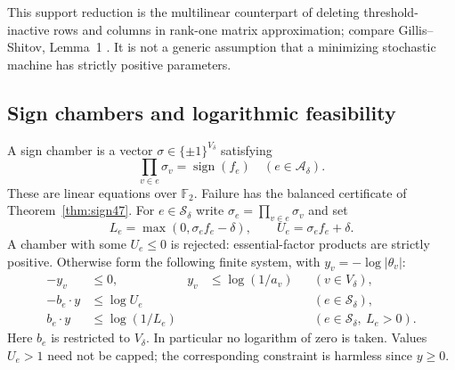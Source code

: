This support reduction is the multilinear counterpart of deleting
threshold-inactive rows and columns in rank-one matrix approximation;
compare Gillis--Shitov, Lemma~1 \cite{GS19}. It is not a generic
assumption that a minimizing stochastic machine has strictly positive
parameters.

\subsection{Sign chambers and logarithmic feasibility}
A sign chamber is a vector $\sigma\in\{\pm1\}^{V_\delta}$ satisfying
\begin{equation}\label{eq:signchamber49}
 \prod_{v\in e}\sigma_v=\operatorname{sign}(f_e)
                         \quad(e\in\mathcal A_\delta).
\end{equation}
These are linear equations over $\mathbb F_2$. Failure has the balanced
certificate of Theorem~\ref{thm:sign47}. For $e\in\mathcal S_\delta$
write $\sigma_e=\prod_{v\in e}\sigma_v$ and set
\begin{equation}\label{eq:interval49}
 L_e=\max(0,\sigma_e f_e-\delta),\qquad U_e=\sigma_e f_e+\delta.
\end{equation}
A chamber with some $U_e\le0$ is rejected: essential-factor products
are strictly positive. Otherwise form the following finite system,
with $y_v=-\log|\theta_v|$:
\begin{equation}\label{eq:loglp49}
 \begin{aligned}
 -y_v&\le0,& y_v&\le\log(1/a_v) &&(v\in V_\delta),\\
 -b_e\cdot y&\le\log U_e&&&&(e\in\mathcal S_\delta),\\
 b_e\cdot y&\le\log(1/L_e)&&&&(e\in\mathcal S_\delta,\ L_e>0).
 \end{aligned}
\end{equation}
Here $b_e$ is restricted to $V_\delta$. In particular no logarithm
of zero is taken. Values $U_e>1$ need not be capped; the corresponding
constraint is harmless since $y\ge0$.


